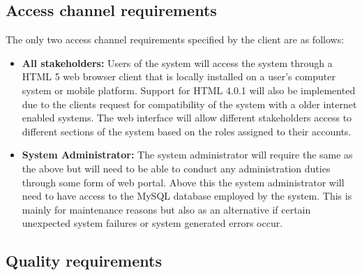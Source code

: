 \documentclass[12pt]{article}
\begin{document}
\subsection{Access channel requirements}
\vspace{0.2in}
The only two access channel requirements specified by the client are as follows:
\begin{itemize}


\item \textbf{All stakeholders:}
Users of the system will access the system through a HTML 5 web browser client that is locally installed on a user's computer system or mobile platform. Support for HTML 4.0.1 will also be implemented due to the clients request for compatibility of the system with a older internet enabled systems. The web interface will allow different stakeholders access to different sections of the system based on the roles assigned to their accounts. 

\item\textbf{System Administrator:}
The system administrator will require the same as the above but will need to be able to conduct any administration duties through some form of web portal. Above this the system administrator will need to have access to the MySQL database employed by the system. This is mainly for maintenance reasons but also as an alternative if certain unexpected system failures or system generated errors occur.

\end{itemize}
\vspace{0.2in}

\subsection{Quality requirements}
\vspace{0.2in}



\vspace{0.1in}
\newpage
\end{document}
